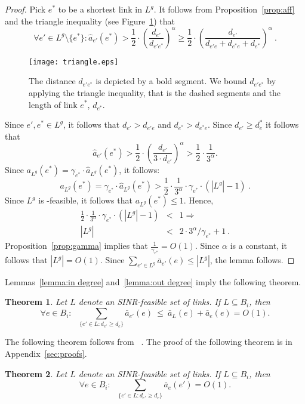 \documentclass[11pt]{article}
\newenvironment{proof sketch}{\noindent {\bf Proof sketch:} }{\hfill \qed}
\newtheorem{theorem}{Theorem}
\newcommand{\sinr}{\text{\sc{sinr}}}
\begin{document}
\begin{proof}
Pick $e^*$ to be a shortest link in $L^{g}$.
It follows from Proposition~\ref{prop:aff} and the triangle inequality (see Figure~\ref{fig:triangle}) that
\[
    \forall e' \in L^{g} \setminus \{e^*\}:
    \hat a_{e'}(e^*) > \frac 12 \cdot \left( \frac{d_{e'}}{d_{e' e^*}}\right)^\alpha \geq
    \frac 12 \cdot \left( \frac{d_{e'}}{d_{e'e} + d_{e^*e} +d_{e^*}}\right)^\alpha\:.
\]
\begin{figure}[H]
  \centering
    \texttt{[image: triangle.eps]}
    \caption{The distance $d_{e'e^*}$ is depicted by a bold segment. We bound $d_{e'e^*}$
    by applying the triangle inequality, that is the dashed segments and the length of link $e^*$, $d_{e^*}$.}
  \label{fig:triangle}
\end{figure}

Since $e',e^* \in L^{g}$, it follows that $d_{e'} > d_{e'e}$ and  $d_{e^*} > d_{e^*e}$.
Since $d_{e'} \geq d_e^* $ it follows that
\[
    \hat a_{e'}(e^*) > \frac 12 \cdot \left( \frac{d_{e'}}{3\cdot d_{e'}}\right)^\alpha > \frac 12 \cdot \frac{1}{3^\alpha}.
\]
Since $a_{L^g}(e^*)= \gamma_{e^*} \cdot {\hat a}_{L^g}(e^*)$, it follows:
$$a_{L^g}(e^*)= \gamma_{e^*}\cdot {\hat a}_{L^g}(e^*) > \frac 12 \cdot \frac{1}{3^\alpha}\cdot \gamma_{e^*} \cdot (|L^{g}| -1)\:.$$
Since $L^{g}$ is \sinr-feasible, it follows that $a_{L^g}(e^*) \leq 1$. Hence,
\begin{eqnarray*}
    \frac 12 \cdot \frac 1{3^\alpha} \cdot \gamma_{e^*}\cdot (|L^{g}| -1) & < & 1 \Rightarrow \\
    |L^{g}| & < & 2 \cdot 3^\alpha/\gamma_{e^*}+1\:.
\end{eqnarray*}
Proposition~\ref{prop:gamma} implies that $\frac {1}{\gamma_{e^*}} = O(1)$.
Since $\alpha$ is a constant, it follows that $|L^{g}| = O(1)$.
Since $\sum_{e' \in L^g } {\bar a}_{e'}(e) \leq |L^{g}|$, the lemma follows.
\end{proof}

\noindent
Lemmas~\ref{lemma:in degree} and~\ref{lemma:out degree} imply the following theorem.
\begin{theorem}\label{thm:in}
  Let $L$ denote an SINR-feasible set of links.  If $L \subseteq
  B_i$, then
     \[
\forall e\in  B_i:~~~\sum_{\{e' \in L : d_{e'} \geq d_{e}\}}\bar a_{e'}(e) ~\leq~ {\bar a}_L(e) + \bar a_{e}(e)= O(1).
     \]
\end{theorem}

\noindent
The following theorem follows from ~\cite[Thm 1]{K10}.
The proof of the following theorem is in Appendix~\ref{sec:proofs}.
\begin{theorem} \label{thm:out}
    Let $L$ denote an SINR-feasible set of links. If $L \subseteq
  B_i$, then
     \[
\forall e\in B_i:~~~           \sum_{\{e' \in L : d_{e'} \geq d_{e}\}}\bar a _{e}(e') = O(1).
     \]
\end{theorem}
\end{document}
